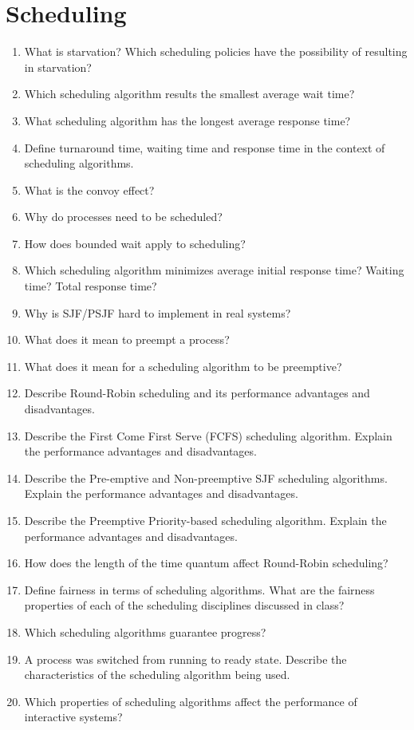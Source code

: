 \documentclass[11pt]{article}
\begin{document}
\section{Scheduling}
\label{sec-11}

\begin{enumerate}
\item What is starvation? Which scheduling policies have the possibility
      of resulting in starvation?
\item Which scheduling algorithm results the smallest average wait time?
\item What scheduling algorithm has the longest average response time?
\item Define turnaround time, waiting time and response time in the
      context of scheduling algorithms.
\item What is the convoy effect?
\item Why do processes need to be scheduled?
\item How does bounded wait apply to scheduling?
\item Which scheduling algorithm minimizes average initial response time?
      Waiting time? Total response time?
\item Why is SJF/PSJF hard to implement in real systems?
\item What does it mean to preempt a process?
\item What does it mean for a scheduling algorithm to be preemptive?
\item Describe Round-Robin scheduling and its performance advantages
       and disadvantages.
\item Describe the First Come First Serve (FCFS) scheduling
       algorithm. Explain the performance advantages and disadvantages.
\item Describe the Pre-emptive and Non-preemptive SJF scheduling
       algorithms. Explain the performance advantages and disadvantages.
\item Describe the Preemptive Priority-based scheduling
       algorithm. Explain the performance advantages and disadvantages.
\item How does the length of the time quantum affect Round-Robin
       scheduling?
\item Define fairness in terms of scheduling algorithms. What are the
       fairness properties of each of the scheduling disciplines discussed in class?
\item Which scheduling algorithms guarantee progress?
\item A process was switched from running to ready state. Describe the
       characteristics of the scheduling algorithm being used.
\item Which properties of scheduling algorithms affect the performance
       of interactive systems?
\end{enumerate}
\end{document}

